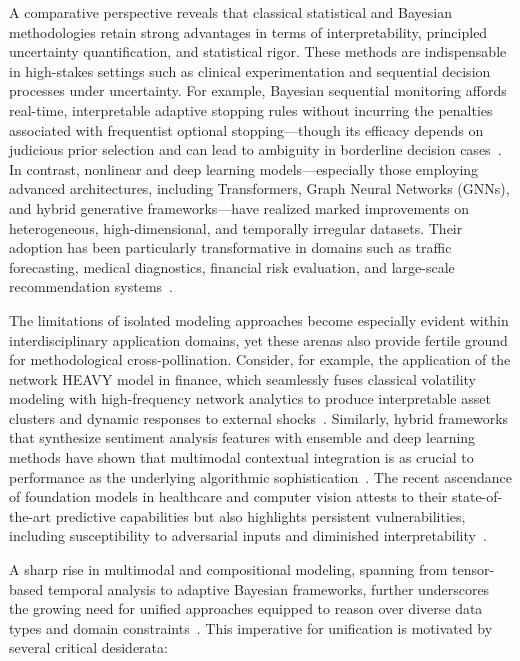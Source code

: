 A comparative perspective reveals that classical statistical and Bayesian methodologies retain strong advantages in terms of interpretability, principled uncertainty quantification, and statistical rigor. These methods are indispensable in high-stakes settings such as clinical experimentation and sequential decision processes under uncertainty. For example, Bayesian sequential monitoring affords real-time, interpretable adaptive stopping rules without incurring the penalties associated with frequentist optional stopping---though its efficacy depends on judicious prior selection and can lead to ambiguity in borderline decision cases~\cite{ref87}. In contrast, nonlinear and deep learning models—especially those employing advanced architectures, including Transformers, Graph Neural Networks (GNNs), and hybrid generative frameworks—have realized marked improvements on heterogeneous, high-dimensional, and temporally irregular datasets. Their adoption has been particularly transformative in domains such as traffic forecasting, medical diagnostics, financial risk evaluation, and large-scale recommendation systems~\cite{ref2,ref7,ref10,ref15,ref20,ref31,ref86}.

The limitations of isolated modeling approaches become especially evident within interdisciplinary application domains, yet these arenas also provide fertile ground for methodological cross-pollination. Consider, for example, the application of the network HEAVY model in finance, which seamlessly fuses classical volatility modeling with high-frequency network analytics to produce interpretable asset clusters and dynamic responses to external shocks~\cite{ref2}. Similarly, hybrid frameworks that synthesize sentiment analysis features with ensemble and deep learning methods have shown that multimodal contextual integration is as crucial to performance as the underlying algorithmic sophistication~\cite{ref8,ref14}. The recent ascendance of foundation models in healthcare and computer vision attests to their state-of-the-art predictive capabilities but also highlights persistent vulnerabilities, including susceptibility to adversarial inputs and diminished interpretability~\cite{ref61,ref65,ref86,ref83}.

A sharp rise in multimodal and compositional modeling, spanning from tensor-based temporal analysis to adaptive Bayesian frameworks, further underscores the growing need for unified approaches equipped to reason over diverse data types and domain constraints~\cite{ref46,ref51,ref69,ref70}. This imperative for unification is motivated by several critical desiderata:


